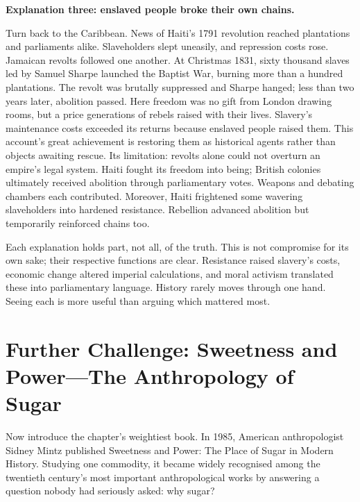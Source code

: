 \textbf{Explanation three: enslaved people broke their own chains.}

Turn back to the Caribbean. News of Haiti's 1791 revolution reached plantations and parliaments alike. Slaveholders slept uneasily, and repression costs rose. Jamaican revolts followed one another. At Christmas 1831, sixty thousand slaves led by Samuel Sharpe launched the Baptist War, burning more than a hundred plantations. The revolt was brutally suppressed and Sharpe hanged; less than two years later, abolition passed. Here freedom was no gift from London drawing rooms, but a price generations of rebels raised with their lives. Slavery's maintenance costs exceeded its returns because enslaved people raised them. This account's great achievement is restoring them as historical agents rather than objects awaiting rescue. Its limitation: revolts alone could not overturn an empire's legal system. Haiti fought its freedom into being; British colonies ultimately received abolition through parliamentary votes. Weapons and debating chambers each contributed. Moreover, Haiti frightened some wavering slaveholders into hardened resistance. Rebellion advanced abolition but temporarily reinforced chains too.

Each explanation holds part, not all, of the truth. This is not compromise for its own sake; their respective functions are clear. Resistance raised slavery's costs, economic change altered imperial calculations, and moral activism translated these into parliamentary language. History rarely moves through one hand. Seeing each is more useful than arguing which mattered most.

\section[Further Challenge: Sweetness and Power]{Further Challenge: Sweetness and Power---The Anthropology of Sugar}
Now introduce the chapter's weightiest book. In 1985, American anthropologist Sidney Mintz published Sweetness and Power: The Place of Sugar in Modern History. Studying one commodity, it became widely recognised among the twentieth century's most important anthropological works by answering a question nobody had seriously asked: why sugar?

